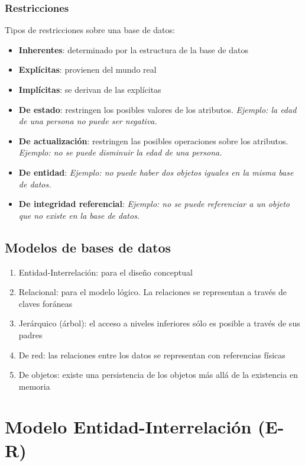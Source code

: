\documentclass[a4paper, twoside]{article}
\begin{document}
\subsubsection{Restricciones}

Tipos de restricciones sobre una base de datos:
\begin{itemize}
\item \textbf{Inherentes}: determinado por la estructura de la base de datos
\item \textbf{Explícitas}: provienen del mundo real
\item \textbf{Implícitas}: se derivan de las explícitas
\item \textbf{De estado}: restringen los posibles valores de los atributos.
\emph{Ejemplo: la edad de una persona no puede ser negativa.}
\item \textbf{De actualización}: restringen las posibles operaciones sobre
los atributos. \emph{Ejemplo: no se puede disminuir la edad de una
persona.}
\item \textbf{De entidad}: \emph{Ejemplo: no puede haber dos objetos iguales
en la misma base de datos.}
\item \textbf{De integridad referencial}: \emph{Ejemplo: no se puede referenciar
a un objeto que no existe en la base de datos.}
\end{itemize}

\subsection{Modelos de bases de datos}
\begin{enumerate}
\item Entidad-Interrelación: para el diseño conceptual
\item Relacional: para el modelo lógico. La relaciones se representan a
través de claves foráneas
\item Jerárquico (árbol): el acceso a niveles inferiores sólo es posible
a través de sus padres
\item De red: las relaciones entre los datos se representan con referencias
físicas
\item De objetos: existe una persistencia de los objetos más allá de la
existencia en memoria
\end{enumerate}

\section{\label{sec:Modelo-Entidad-Interrelaci=0000F3n}Modelo Entidad-Interrelación
(E-R)}
\end{document}
